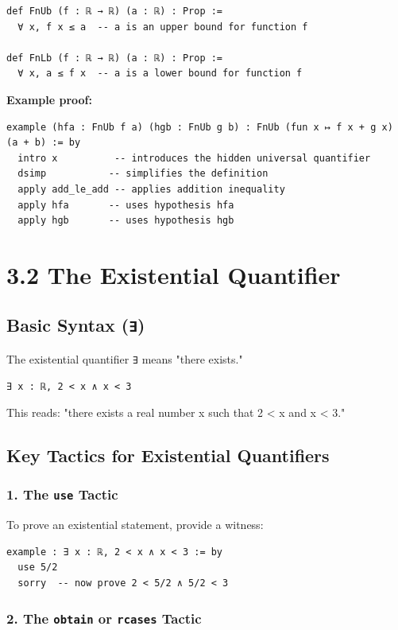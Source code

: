 \documentclass{amsart}
\theoremstyle{plain}
\theoremstyle{definition}
\theoremstyle{remark}
\begin{document}
\begin{lstlisting}[language=lean]
def FnUb (f : ℝ → ℝ) (a : ℝ) : Prop :=
  ∀ x, f x ≤ a  -- a is an upper bound for function f

def FnLb (f : ℝ → ℝ) (a : ℝ) : Prop :=
  ∀ x, a ≤ f x  -- a is a lower bound for function f
\end{lstlisting}
\textbf{Example proof:}

\begin{lstlisting}[language=lean]
example (hfa : FnUb f a) (hgb : FnUb g b) : FnUb (fun x ↦ f x + g x) (a + b) := by
  intro x          -- introduces the hidden universal quantifier
  dsimp           -- simplifies the definition
  apply add_le_add -- applies addition inequality
  apply hfa       -- uses hypothesis hfa
  apply hgb       -- uses hypothesis hgb
\end{lstlisting}
\section{3.2 The Existential Quantifier}

\subsection{Basic Syntax (\lstinline{∃})}

The existential quantifier \lstinline{∃} means "there exists."

\begin{lstlisting}[language=lean]
∃ x : ℝ, 2 < x ∧ x < 3
\end{lstlisting}
This reads: "there exists a real number x such that 2 < x and x < 3."

\subsection{Key Tactics for Existential Quantifiers}

\subsubsection{1. The \lstinline{use} Tactic}

To prove an existential statement, provide a witness:

\begin{lstlisting}[language=lean]
example : ∃ x : ℝ, 2 < x ∧ x < 3 := by
  use 5/2
  sorry  -- now prove 2 < 5/2 ∧ 5/2 < 3
\end{lstlisting}
\subsubsection{2. The \lstinline{obtain} or \lstinline{rcases} Tactic}
\end{document}
